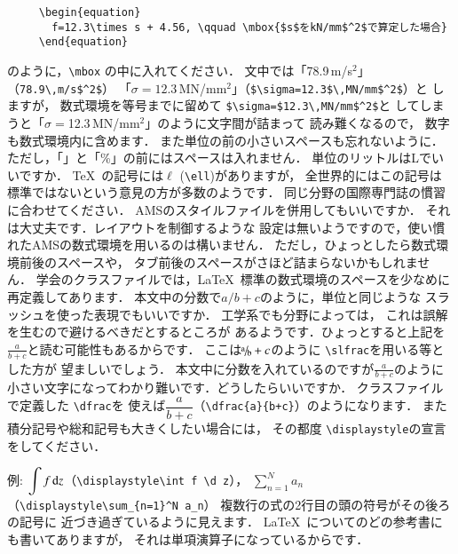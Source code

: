 \documentclass[dvipdfmx,onecolumn]{jsce}  %
\begin{document}
\begin{Enumerate}
\renewcommand{\baselinestretch}{0.75}\small\normalsize
\begin{verbatim}
     \begin{equation}
       f=12.3\times s + 4.56, \qquad \mbox{$s$をkN/mm$^2$で算定した場合}
     \end{equation}
\end{verbatim}
\renewcommand{\baselinestretch}{1}\small\normalsize
のように，\verb+\mbox+ の中に入れてください．
文中では「78.9\,m/s$^2$」（\verb+78.9\,m/s$^2$+）
「$\sigma=12.3$\,MN/mm$^2$」（\verb+$\sigma=12.3$\,MN/mm$^2$+）と
しますが，
数式環境を等号までに留めて \verb+$\sigma=$12.3\,MN/mm$^2$+と
してしまうと「$\sigma=$12.3\,MN/mm$^2$」のように文字間が詰まって
読み難くなるので，
数字も数式環境内に含めます．
また単位の前の小さいスペースも忘れないように．
ただし，「\degC」と「\%」の前にはスペースは入れません．
%
\Qitem 単位のリットルはLでいいですか．
\Aitem \TeX\ の記号には$\ell$ (\verb+\ell+)がありますが，
全世界的にはこの記号は
標準ではないという意見の方が多数のようです．
同じ分野の国際専門誌の慣習に合わせてください．
%
\Qitem AMSのスタイルファイルを併用してもいいですか．
\Aitem それは大丈夫です．レイアウトを制御するような
設定は無いようですので，使い慣れたAMSの数式環境を用いるのは構いません．
ただし，ひょっとしたら数式環境前後のスペースや，
タブ前後のスペースがさほど詰まらないかもしれません．
学会のクラスファイルでは，\LaTeX\ 標準の数式環境のスペースを少なめに
再定義してあります．
%
\Qitem 本文中の分数で$a/b+c$のように，単位と同じような
スラッシュを使った表現でもいいですか．
\Aitem 工学系でも分野によっては，
これは誤解を生むので避けるべきだとするところが
あるようです．ひょっとすると上記を$\frac{a}{b+c}$と読む可能性もあるからです．
ここは$\slfrac{a}{b}+c$のように \verb+\slfrac+を用いる等とした方が
望ましいでしょう．
%
\Qitem 本文中に分数を入れているのですが$\frac{a}{b+c}$のように
小さい文字になってわかり難いです．どうしたらいいですか．
\Aitem クラスファイルで定義した \verb+\dfrac+を
使えば$\dfrac{a}{b+c}$（\verb|\dfrac{a}{b+c}|）のようになります．
また積分記号や総和記号も大きくしたい場合には，
その都度 \verb+\displaystyle+の宣言をしてください．

例: $\displaystyle\int f \,\mbox{d} z$（\verb+\displaystyle\int f \d z+），
$\displaystyle\sum_{n=1}^N a_n$（\verb+\displaystyle\sum_{n=1}^N a_n+）
%
\Qitem 複数行の式の2行目の頭の符号がその後ろの記号に
近づき過ぎているように見えます．
\Aitem \LaTeX\ についてのどの参考書にも書いてありますが，
それは単項演算子になっているからです．


\end{Enumerate}
\end{document}
